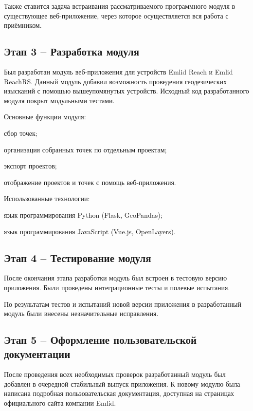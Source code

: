 \documentclass[ltitles]{../../scs-iam}
\begin{document}
  Также ставится задача встраивания рассматриваемого программного модуля в существующее веб-приложение, через которое осуществляется вся работа с приёмником.
  
  \subsection{Этап 3 -- Разработка модуля}
  
  Был разработан модуль веб-приложения для устройств Emlid Reach и Emlid ReachRS. Данный модуль добавил возможность проведения геодезических изысканий с помощью вышеупомянутых устройств. Исходный код разработанного модуля покрыт модульными тестами. \par
  
  Основные функции модуля:
  \begin{dashitemize}
    \item сбор точек;
    \item организация собранных точек по отдельным проектам;
    \item экспорт проектов;
    \item отображение проектов и точек с помощь веб-приложения.
  \end{dashitemize}
  
  Использованные технологии:
  \begin{dashitemize}
    \item язык программирования Python (Flask, GeoPandas);
    \item язык программирования JavaScript (Vue.js, OpenLayers).
  \end{dashitemize}
  
  \subsection{Этап 4 -- Тестирование модуля}
  
  После окончания этапа разработки модуль был встроен в тестовую версию приложения. Были проведены интеграционные тесты и полевые испытания. \par
  
  По результатам тестов и испытаний новой версии приложения в разработанный модуль были внесены незначительные исправления.
  
  \subsection{Этап 5 -- Оформление пользовательской документации}
  
  После проведения всех необходимых проверок разработанный модуль был добавлен в очередной стабильный выпуск приложения. К новому модулю была написана подробная пользовательская документация, доступная на страницах официального сайта компании Emlid.
\end{document}

